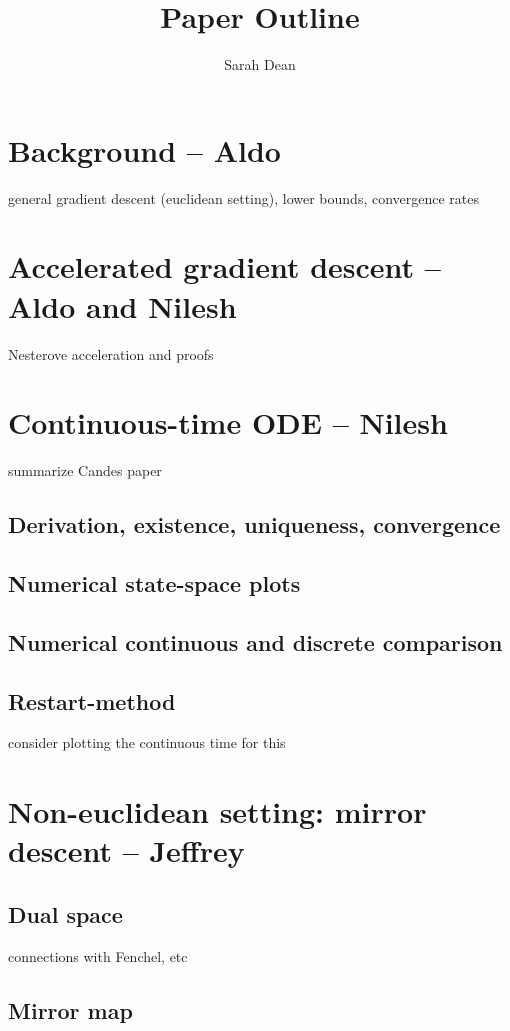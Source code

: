 \documentclass{article}
\title{Paper Outline}
\author{Sarah Dean}
\begin{document}
\maketitle

\section{Background -- Aldo}
general gradient descent (euclidean setting), lower bounds, convergence rates 

\section{Accelerated gradient descent -- Aldo and Nilesh}
Nesterove acceleration and proofs

\section{Continuous-time ODE -- Nilesh}
summarize Candes paper
\subsection{Derivation, existence, uniqueness, convergence}
\subsection{Numerical state-space plots}
\subsection{Numerical continuous and discrete comparison}
\subsection{Restart-method}
consider plotting the continuous time for this

\section{Non-euclidean setting: mirror descent -- Jeffrey}

\subsection{Dual space}
connections with Fenchel, etc

\subsection{Mirror map}
\end{document}
